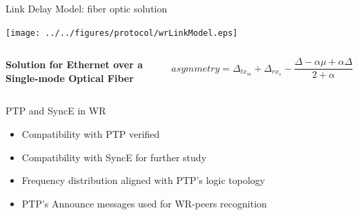 \documentclass[compress,red]{beamer}
\begin{document}
\begin{frame}{Link Delay Model: fiber optic solution}

  \begin{center}
  \texttt{[image: ../../figures/protocol/wrLinkModel.eps]}
  \end{center}

  \begin{columns}[c]
  \column{1.5in}

    \begin{center}
      \textbf{Solution for Ethernet over a Single-mode Optical Fiber}
    \end{center}    

  \column{2.7in}

    \begin{equation}
      \nonumber asymmetry = \Delta_{tx_m} + \Delta_{rx_s} - \frac{\Delta - \alpha \mu + \alpha \Delta}{2 + \alpha}
    \end{equation}

  \end{columns}

\end{frame}
\begin{frame}{PTP and SyncE in WR}

  \begin{itemize}
    \item Compatibility with PTP verified
    \item Compatibility with SyncE for further study
    \item Frequency distribution aligned with PTP's logic topology
    \item PTP's Announce messages used for WR-peers recognition
  \end{itemize}

\end{frame}
\end{document}
